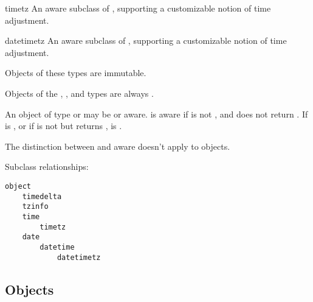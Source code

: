 \begin{classdesc*}{timetz}
  An aware subclass of , supporting a customizable notion of
  time adjustment.
\end{classdesc*}

\begin{classdesc*}{datetimetz}
  An aware subclass of , supporting a customizable notion of
  time adjustment.
\end{classdesc*}

Objects of these types are immutable.

Objects of the , , and  types
are always \naive.

An object  of type  or  may be
{\naive} or aware.   is aware if  is not
, and  does not return
.  If  is , or if 
is not  but  returns
,  is \naive.

The distinction between {\naive} and aware doesn't apply to
 objects.

Subclass relationships:

\begin{verbatim}
object
    timedelta
    tzinfo
    time
        timetz
    date
        datetime
            datetimetz
\end{verbatim}

\subsection{ Objects \label{datetime-timedelta}}

